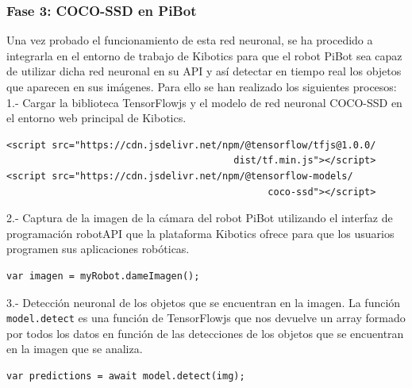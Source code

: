 \documentclass{report}
\begin{document}
\newpage
\subsubsection{Fase 3: COCO-SSD en PiBot}
Una vez probado el funcionamiento de esta red neuronal, se ha procedido a integrarla en el entorno de trabajo de Kibotics para que el robot PiBot sea capaz de utilizar dicha red neuronal en su API y así detectar en tiempo real los objetos que aparecen en sus imágenes. Para ello se han realizado los siguientes procesos:
\\

1.- Cargar la biblioteca TensorFlowjs y el modelo de red neuronal COCO-SSD en el entorno web principal de Kibotics.

\begin{lstlisting}[backgroundcolor = \color{light-gray},
				   aboveskip = 2em,
				   belowskip = 2em,
                   framexleftmargin = 1em,
                   basicstyle=\small]
<script src="https://cdn.jsdelivr.net/npm/@tensorflow/tfjs@1.0.0/
                                        dist/tf.min.js"></script>
<script src="https://cdn.jsdelivr.net/npm/@tensorflow-models/
                                              coco-ssd"></script>
\end{lstlisting}

2.- Captura de la imagen de la cámara del robot PiBot utilizando el interfaz de programación robotAPI que la plataforma Kibotics ofrece para que los usuarios programen sus aplicaciones robóticas.

\begin{lstlisting}[backgroundcolor = \color{light-gray},
				   aboveskip = 2em,
				   belowskip = 2em,
                   xleftmargin = 2cm,
                   framexleftmargin = 1em,
                   basicstyle=\small]
var imagen = myRobot.dameImagen();
\end{lstlisting}

3.- Detección neuronal de los objetos que se encuentran en la imagen. La función \texttt{model.detect} es una función de TensorFlowjs que nos devuelve un array formado por todos los datos en función de las detecciones de los objetos que se encuentran en la imagen que se analiza.

\begin{lstlisting}[backgroundcolor = \color{light-gray},
				   aboveskip = 2em,
				   belowskip = 2em,
                   xleftmargin = 2cm,
                   framexleftmargin = 1em,
                   basicstyle=\small]
var predictions = await model.detect(img);
\end{lstlisting}
\end{document}
